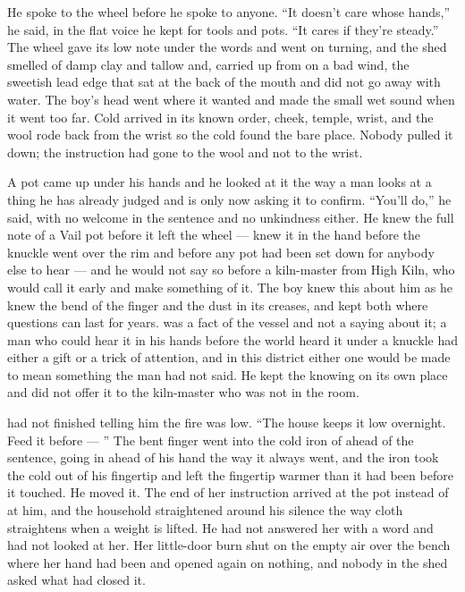 \scenebreak

He spoke to the wheel before he spoke to anyone. “It doesn't care whose hands,” he said, in the flat voice he kept for tools and pots. “It cares if they're steady.” The wheel gave its low note under the words and went on turning, and the shed smelled of damp clay and tallow and, carried up from  on a bad wind, the sweetish lead edge that sat at the back of the mouth and did not go away with water. The boy's head went where it wanted and made the small wet sound when it went too far. Cold arrived in its known order, cheek, temple, wrist, and the wool rode back from the wrist so the cold found the bare place. Nobody pulled it down; the instruction had gone to the wool and not to the wrist.

A pot came up under his hands and he looked at it the way a man looks at a thing he has already judged and is only now asking it to confirm. “You'll do,” he said, with no welcome in the sentence and no unkindness either. He knew the full note of a Vail pot before it left the wheel --- knew it in the hand before the knuckle went over the rim and before any pot had been set down for anybody else to hear --- and he would not say so before a kiln-master from High Kiln, who would call it early and make something of it. The boy knew this about him as he knew the bend of the finger and the dust in its creases, and kept both where questions can last for years.  was a fact of the vessel and not a saying about it; a man who could hear it in his hands before the world heard it under a knuckle had either a gift or a trick of attention, and in this district either one would be made to mean something the man had not said. He kept the knowing on its own place and did not offer it to the kiln-master who was not in the room.

\scenebreak

 had not finished telling him the fire was low. “The house keeps it low overnight. Feed it before --- ” The bent finger went into the cold iron of  ahead of the sentence, going in ahead of his hand the way it always went, and the iron took the cold out of his fingertip and left the fingertip warmer than it had been before it touched. He moved it. The end of her instruction arrived at the pot instead of at him, and the household straightened around his silence the way cloth straightens when a weight is lifted. He had not answered her with a word and had not looked at her. Her little-door burn shut on the empty air over the bench where her hand had been and opened again on nothing, and nobody in the shed asked what had closed it.

